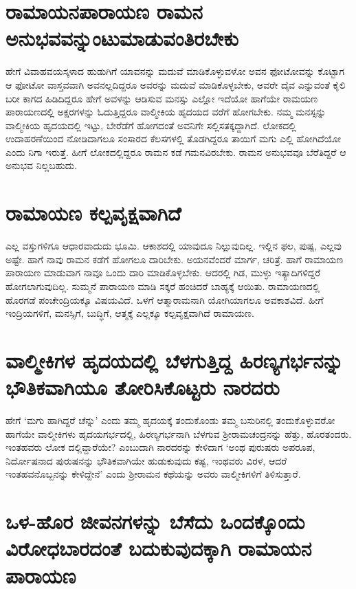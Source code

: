\section*{ರಾಮಾಯನಪಾರಾಯಣ ರಾಮನ ಅನುಭವವನ್ನುಂಟುಮಾಡುವಂತಿರಬೇಕು}

ಹೇಗೆ ವಿವಾಹವಯಸ್ಕಳಾದ ಹುಡುಗಿಗೆ ಯಾವನನ್ನು ಮದುವೆ ಮಾಡಿಕೊಳ್ಳುವಳೋ ಅವನ ಫೋಟೋವನ್ನು ಕೊಟ್ಟಾಗ ಆ‌ ಫೋಟೋ ವಾಸ್ತವವಾಗಿ ಅವನಲ್ಲದಿದ್ದರೂ ಅವರನ್ನು ಮದುವೆ ಮಾಡಿಕೊಳ್ಳಬೇಕು, ಅವರೇ ದೈವ ಎನ್ನುವಂತೆ ಕೈಲಿ ಬರೀ ಕಾಗದ ಹಿಡಿದಿದ್ದರೂ ಹೇಗೆ ಅವಳನ್ನು ಆಡಿಸುವ ಮನಸ್ಸು ಎಲ್ಲೋ ಇದೆಯೋ ಹಾಗೆಯೇ ರಾಮಯಣ ಪಾರಾಯಣದಲ್ಲಿ ಅಕ್ಷರಗಳನ್ನು ಓದುತ್ತಿದ್ದರೂ ವಾಲ್ಮೀಕಿಯ ಹೃದಯದ ವರೆಗೆ ಹೋಗಬೇಕು. ನಮ್ಮ ಮನಸ್ಸನ್ನು ವಾಲ್ಮೀಕಿಯ ಹೃದಯದಲ್ಲಿ ಇಟ್ಟು, ಬೇರೆಡೆಗೆ ಹೋಗದಂತೆ ಅವನಿಗೇ ಸಲ್ಲಿಸತಕ್ಕದ್ದಾಗಿದೆ. ಲೋಕದಲ್ಲಿ ಉದಾಹರಣೆಯಿಂದ ನೋಡಿದಾಗಲೂ ಸಂಸಾರದ ಕೆಲಸಗಳಲ್ಲಿ ತೊಡಗಿದ್ದರೂ ತಾಯಿಗೆ ಮಗು ಎಲ್ಲಿ ಹೋಗಿದೆಯೋ ಎಂದು ನಿಗಾ ಇರುತ್ತೆ. ಹೀಗೆ ಲೋಕದಲ್ಲಿದ್ದರೂ ರಾಮನ ಕಡೆ ಗಮನವಿರಬೇಕು. ರಾಮನ ಅನುಭವವೂ ಬೆರೆತಿದ್ದರೆ ಆ ಅನುಭವ ನಿಲ್ಲಬಹುದು. 

\section*{ರಾಮಾಯಣ ಕಲ್ಪವೃಕ್ಷವಾಗಿದೆ}

ಎಲ್ಲ ವಸ್ತುಗಳಿಗೂ ಆಧಾರವಾದುದು ಭೂಮಿ. ಆಕಾಶದಲ್ಲಿ ಯಾವುದೂ ನಿಲ್ಲುವುದಿಲ್ಲ. ಇಲ್ಲಿನ ಫಲ, ಪುಷ್ಪ, ಎಲ್ಲವು ಅಷ್ಟೇ. ಹಾಗೆ ನಾವು ರಾಮನ ಕಡೆಗೆ ಹೋಗಲೂ ದಾರಿಬೇಕು. ಅಯನವೆಂದರೆ ಮಾರ್ಗ, ಚರಿತ್ರೆ. ಹಾಗೆ ರಾಮಾಯಣ ಪಾರಾಯಣ ಮಾಡುವಾಗ ನಾವೂ ಒಂದು ದಾರಿ ಮಾಡಿಕೊಳ್ಳಬೇಕು. ಆದರಲ್ಲಿ ಗಿಡ, ಮುಳ್ಳು ಇತ್ಯಾದಿಗಳಿದ್ದರೆ ಹೋಗಲಾಗುವುದಿಲ್ಲ. ಸುಮ್ಮನೆ ಪಾರಾಯಣ ಮಾಡಿ ಸಕ್ಕರೆ ಹಂಚಿದರೆ ಬಾಹ್ಯಕ್ಕೆ ಆಯಿತು. ರಾಮಾಯಣದಲ್ಲಿ ಹೊರಗಡೆ ಪಂಚೇಂದ್ರಿಯಕ್ಕೂ ವಿಷಯವಿದೆ. ಒಳಗೆ ಆತ್ಮಾರಾಮನಾಗಿ ಯೋಗಿಯಾಗಲೂ ಅವಕಾಶವಿದೆ. ಹೀಗೆ ಇಂದ್ರಿಯಗಳಿಗೆ, ಮನಸ್ಸಿಗೆ, ಬುದ್ಧಿಗೆ, ಆತ್ಮಕ್ಕೆ  ಎಲ್ಲಕ್ಕೂ ಕಲ್ಪವೃಕ್ಷವಾಗಿದೆ ರಾಮಾಯಣ. 

\section*{ವಾಲ್ಮೀಕಿಗಳ ಹೃದಯದಲ್ಲಿ ಬೆಳಗುತ್ತಿದ್ದ ಹಿರಣ್ಯಗರ್ಭನನ್ನು ಭೌತಿಕವಾಗಿಯೂ ತೋರಿಸಿಕೊಟ್ಟರು ನಾರದರು}

ಹೇಗೆ `ಮಗು ಹಾಗಿದ್ದರೆ ಚೆನ್ನು' ಎಂದು ತಮ್ಮ ಹೃದಯಕ್ಕೆ  ತಂದುಕೊಂಡು ತಮ್ಮ ಬಸುರಿನಲ್ಲಿ ತಂದುಕೊಳ್ಳುವರೋ ಹಾಗೆಯೇ ವಾಲ್ಮೀಕಿಗಳು ಹೃದಯಗರ್ಭದಲ್ಲಿ, ಹಿರಣ್ಯಗರ್ಭನಾಗಿ ಬೆಳಗುವ ಶ್ರೀರಾಮಚಂದ್ರನನ್ನು ಹೆತ್ತು, ಹೊರತಂದರು. ಇಂತಹವರು ಲೋಕ ದಲ್ಲಿವ್ದಾರೆಯೇ? ಎಂಬುದಾಗಿ ನಾರದರನ್ನು ಕೇಳಿದಾಗ `ಅಂಥ ಪುರುಷರು ಅಪರೂಪ, ನಿರ್ದೋಷನಾದ ಪುರುಷನನ್ನು ಭೌತಿಕವಾಗಿಯೇ ಹುಡುಕುವುದು ಕಷ್ಟ, ಇಂಥವರು ವಿರಳ, ಆದರೆ ಇಂತಹವನೊಬ್ಬನನ್ನು ಕೇಳಿದ್ದೇನೆ' ಎಂದು ಶ್ರೀರಾಮನ ಕಥೆಯನ್ನು ಅವರು ವಾಲ್ಮೀಕಿಗಳಿಗೆ ತಿಳಿಸುತ್ತಾರೆ. 

\section*{ಒಳ-ಹೊರ ಜೀವನಗಳನ್ನು ಬೆಸೆದು ಒಂದಕ್ಕೊಂದು ವಿರೋಧಬಾರದಂತೆ ಬದುಕುವುದಕ್ಕಾಗಿ ರಾಮಾಯನ ಪಾರಾಯಣ}

